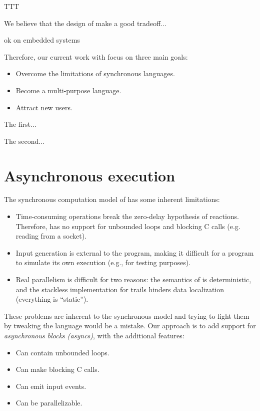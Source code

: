 TTT

We believe that the design of \CEU make a good tradeoff...

ok on embedded systems

Therefore, our current work with \CEU focus on three main goals:

\begin{itemize}
\item Overcome the limitations of synchronous languages.
\item Become a multi-purpose language.
\item Attract new users.
\end{itemize}

The first...

The second...

\section{Asynchronous execution}

The synchronous computation model of \CEU has some inherent limitations:
%
\begin{itemize}
\item Time-consuming operations break the zero-delay hypothesis of reactions.
      Therefore, \CEU has no support for unbounded loops and blocking C calls 
      (e.g. reading from a socket).
%
\item Input generation is external to the program, making it difficult for a 
      program to simulate its own execution (e.g., for testing purposes).
%
\item Real parallelism is difficult for two reasons:
      the semantics of \CEU is deterministic,
      and the stackless implementation for trails hinders data localization 
      (everything is ``static'').
\end{itemize}

These problems are inherent to the synchronous model and trying to fight them 
by tweaking the language would be a mistake.
%
Our approach is to add support for \emph{asynchronous blocks (asyncs)}, with 
the additional features:
%
\begin{itemize}
\item Can contain unbounded loops.
\item Can make blocking C calls.
\item Can emit input events.
\item Can be parallelizable.
\end{itemize}

